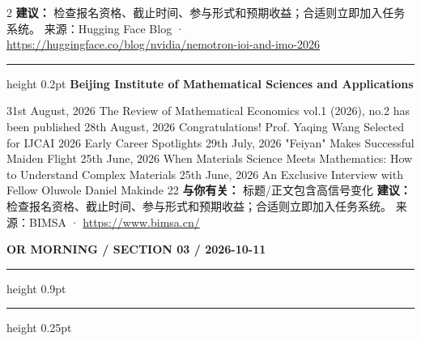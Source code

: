 \documentclass[10.5pt]{ctexart}
\begin{document}
\begin{multicols}{2}
\textbf{建议：} 检查报名资格、截止时间、参与形式和预期收益；合适则立即加入任务系统。
{\footnotesize\color{ormuted} 来源：Hugging Face Blog · \url{https://huggingface.co/blog/nvidia/nemotron-ioi-and-imo-2026}}
\vspace{2mm}
\hrule height 0.2pt
\vspace{2mm}
{\large\bfseries Beijing Institute of Mathematical Sciences and Applications}\par
31st August, 2026 The Review of Mathematical Economics vol.1 (2026), no.2 has been published 28th August, 2026 Congratulations! Prof. Yaqing Wang Selected for IJCAI 2026 Early Career Spotlights 29th July, 2026 "Feiyan" Makes Successful Maiden Flight 25th June, 2026 When Materials Science Meets Mathematics: How to Understand Complex Materials 25th June, 2026 An Exclusive Interview with Fellow Oluwole Daniel Makinde 22
\textbf{与你有关：} 标题/正文包含高信号变化
\textbf{建议：} 检查报名资格、截止时间、参与形式和预期收益；合适则立即加入任务系统。
{\footnotesize\color{ormuted} 来源：BIMSA · \url{https://www.bimsa.cn/}}
\end{multicols}
\newpage
{\small\bfseries OR MORNING / SECTION 03 / 2026-10-11}
\vspace{2mm}
\hrule height 0.9pt
\vspace{1.5mm}
\hrule height 0.25pt
\vspace{4mm}
\end{document}
